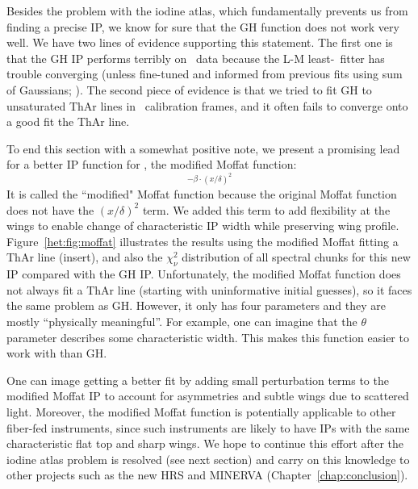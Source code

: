 Besides the problem with the iodine atlas, which fundamentally
prevents us from finding a precise IP, we know for sure that the GH
function does not work very well. We have two lines of evidence
supporting this statement. The first one is that the GH IP performs
terribly on \keck\ data because the L-M least-\chisq\ fitter has
trouble converging (unless fine-tuned and informed from previous fits
using sum of Gaussians; \citealt{2013AAS...22114908V}). The second
piece of evidence is that we tried to fit GH to unsaturated ThAr lines
in \het\ calibration frames, and it often fails to converge onto a
good fit the ThAr line. 

To end this section with a somewhat positive note, we present a
promising lead for a better IP function for \hrs, the modified Moffat
function:
\begin{equation}
[1+(x/\theta)^2]^{-\beta\cdot(x/\delta)^2}
\end{equation} 
It is called the ``modified" Moffat function because the original
Moffat function does not have the $(x/\delta)^2$ term. We added this
term to add flexibility at the wings to enable change of
characteristic IP width while preserving wing
profile. Figure~\ref{het:fig:moffat} illustrates the results using the
modified Moffat fitting a ThAr line (insert), and also the
$\chi^2_\nu$ distribution of all spectral chunks for this new IP
compared with the GH IP. Unfortunately, the modified Moffat function
does not always fit a ThAr line (starting with uninformative initial
guesses), so it faces the same problem as GH. However, it only has
four parameters and they are mostly ``physically meaningful''. For
example, one can imagine that the $\theta$ parameter describes some
characteristic width. This makes this function easier to work with than
GH.

One can image getting a better fit by adding small perturbation terms
to the modified Moffat IP to account for asymmetries and subtle wings
due to scattered light. Moreover, the modified Moffat function is
potentially applicable to other fiber-fed instruments, since such
instruments are likely to have IPs with the same characteristic flat
top and sharp wings. We hope to continue this effort after the iodine
atlas problem is resolved (see next section) and carry on this
knowledge to other projects such as the new HRS and MINERVA
(Chapter~\ref{chap:conclusion}).



